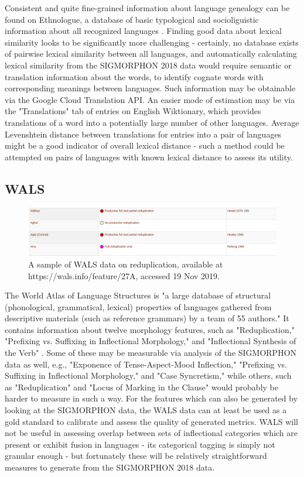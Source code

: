 Consistent and quite fine-grained information about language genealogy can be found on Ethnologue, a database of basic typological and socioliguistic information about all recognized languages \parencite{Ethnologue}. Finding good data about lexical similarity looks to be significantly more challenging - certainly, no database exists of pairwise lexical similarity between all languages, and automatically calculating lexical similarity from the SIGMORPHON 2018 data would require semantic or translation information about the words, to identify cognate words with corresponding meanings between languages. Such information may be obtainable via the Google Cloud Translation API. An easier mode of estimation may be via the "Translations" tab of entries on English Wiktionary, which provides translations of a word into a potentially large number of other languages. Average Levenshtein distance between translations for entries into a pair of languages might be a good indicator of overall lexical distance - such a method could be attempted on pairs of languages with known lexical distance to assess its utility.

\subsection{WALS}

\begin{figure}[t]
\includegraphics[width=13.5cm]{images/WALS.png}
\centering
\caption{A sample of WALS data on reduplication, available at https://wals.info/feature/27A, accessed 19 Nov 2019.}
\end{figure}

The World Atlas of Language Structures is "a large database of structural (phonological, grammatical, lexical) properties of languages gathered from descriptive materials (such as reference grammars) by a team of 55 authors." It contains information about twelve morphology features, such as "Reduplication," "Prefixing vs. Suffixing in Inflectional Morphology," and "Inflectional Synthesis of the Verb" \parencite{WALS}. Some of these may be measurable via analysis of the SIGMORPHON data as well, e.g., "Exponence of Tense-Aspect-Mood Inflection," "Prefixing vs. Suffixing in Inflectional Morphology," and "Case Syncretism," while others, such as "Reduplication" and "Locus of Marking in the Clause" would probably be harder to measure in such a way. For the features which can also be generated by looking at the SIGMORPHON data, the WALS data can at least be used as a gold standard to calibrate and assess the quality of generated metrics. WALS will not be useful in assessing overlap between sets of inflectional categories which are present or exhibit fusion in languages - its categorical tagging is simply not granular enough - but fortunately these will be relatively straightforward measures to generate from the SIGMORPHON 2018 data.

